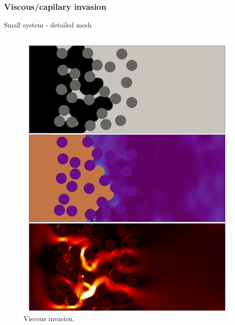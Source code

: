 \documentclass[10pt,handout]{beamer}
\begin{document}
\begin{frame}\frametitle{Viscous/capilary invasion}
Small system - detailed mesh

\begin{figure}
  \begin{minipage}[c]{0.45\textwidth}
    \includegraphics[width=\textwidth]{obrazki_md/invasion/c1.jpg} 
    \caption{Viscous invasion.}
  \end{minipage}\hfill
  \begin{minipage}[c]{0.45\textwidth} %

\end{minipage}
\end{figure}
\end{frame}
\end{document}
